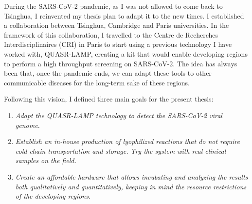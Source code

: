 During the SARS-CoV-2 pandemic, as I was not allowed to come back to Tsinghua, I reinvented my thesis plan to adapt it to the new times. I established a collaboration between Tsinghua, Cambridge and Paris universities. In the framework of this collaboration, I travelled to the Centre de Recherches Interdisciplinaires (CRI) in Paris to start using a previous technology I have worked with, QUASR-LAMP, creating a kit that would enable developing regions to perform a high throughput screening on SARS-CoV-2. The idea has always been that, once the pandemic ends, we can adapt these tools  to other communicable diseases for the long-term sake of these regions.

\vspace{12pt}
Following this vision, I defined three main goals for the present thesis:
\vspace{8pt}
\begin{enumerate}
   \item \emph{Adapt the QUASR-LAMP technology to detect the SARS-CoV-2 viral genome.}
   \item \emph{Establish an in-house production of lyophilized reactions that do not require cold chain transportation and storage. Try the system with real clinical samples on the field.}
   \item \emph{Create an affordable hardware that allows incubating and analyzing the results both qualitatively and quantitatively, keeping in mind the resource restrictions of the developing regions.}
\end{enumerate}